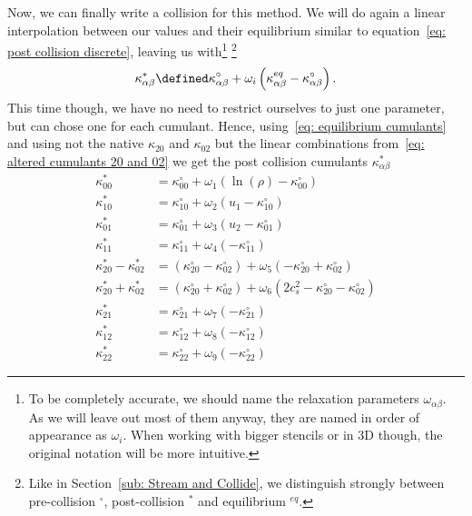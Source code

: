 
Now, we can finally write a collision for this method.
We will do again a linear interpolation between our values and their equilibrium similar to equation~\eqref{eq: post collision discrete}, leaving us with\footnote{To be completely accurate, we should name the relaxation parameters $\omega_{\alpha\beta}$.
As we will leave out most of them anyway, they are named in order of appearance as $\omega_{i}$.
When working with bigger stencils or in 3D though, the original notation will be more intuitive.}
\footnote{Like in Section~\eqref{sub: Stream and Collide}, we distinguish strongly between pre-collision $^\circ$, post-collision $^*$ and equilibrium $^{eq}$.}
\begin{equation}
  \kappa_{\alpha\beta}^* \defined \kappa_{\alpha\beta}^{\circ} + \omega_i \left( \kappa_{\alpha\beta}^{eq} - \kappa_{\alpha\beta}^{\circ} \right).
\end{equation}
This time though, we have no need to restrict ourselves to just one parameter, but can chose one for each cumulant.
Hence, using~\eqref{eq: equilibrium cumulants} and using not the native $\kappa_{20}$ and $\kappa_{02}$ but the linear combinations from~\eqref{eq: altered cumulants 20 and 02} we get the post collision cumulants $\kappa_{\alpha\beta}^*$
\begin{equation}
  \label{eq: post equilibrium cumulants}
  \begin{aligned}
    \kappa_{00}^{*} & = \kappa_{00}^{\circ}+ \omega_1 \left( \ln(\rho) - \kappa_{00}^{\circ}\right) \\
    \kappa_{10}^{*} & = \kappa_{10}^{\circ}+ \omega_2 \left( u_1 - \kappa_{10}^{\circ}\right) \\
    \kappa_{01}^{*} & = \kappa_{01}^{\circ}+ \omega_3 \left( u_2 - \kappa_{01}^{\circ}\right) \\
    \kappa_{11}^{*} & = \kappa_{11}^{\circ}+ \omega_4 \left( - \kappa_{11}^{\circ}\right) \\
    \kappa_{20}^{*} - \kappa_{02}^{*}
      & = (\kappa_{20}^{\circ}- \kappa_{02}^{\circ}) + \omega_5 \left( - \kappa_{20}^{\circ}+ \kappa_{02}^{\circ}\right) \\
    \kappa_{20}^{*} + \kappa_{02}^{*}
      & = (\kappa_{20}^{\circ}+ \kappa_{02}^{\circ}) + \omega_6 \left( 2 c_s^2 - \kappa_{20}^{\circ}- \kappa_{02}^{\circ}\right) \\
    \kappa_{21}^{*} & = \kappa_{21}^{\circ}+ \omega_7 \left( - \kappa_{21}^{\circ}\right) \\
    \kappa_{12}^{*} & = \kappa_{12}^{\circ}+ \omega_8 \left( - \kappa_{12}^{\circ}\right) \\
    \kappa_{22}^{*} & = \kappa_{22}^{\circ}+ \omega_9 \left( - \kappa_{22}^{\circ}\right)
  \end{aligned}
\end{equation}
